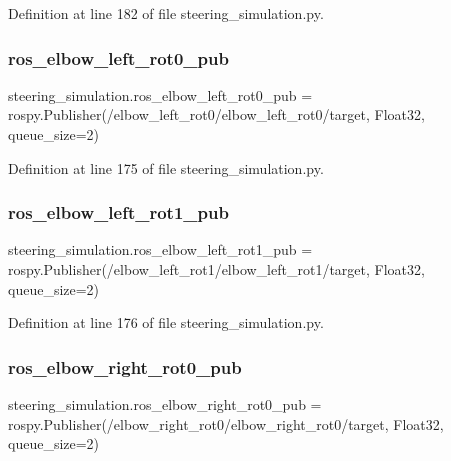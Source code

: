 Definition at line 182 of file steering\+\_\+simulation.\+py.

\mbox{\label{namespacesteering__simulation_a3e18ade3c9e741db3cd48035d7d11b43}} 
\subsubsection{\texorpdfstring{ros\_elbow\_left\_rot0\_pub}{ros\_elbow\_left\_rot0\_pub}}
{\footnotesize\ttfamily steering\+\_\+simulation.\+ros\+\_\+elbow\+\_\+left\+\_\+rot0\+\_\+pub = rospy.\+Publisher(\textquotesingle{}/elbow\+\_\+left\+\_\+rot0/elbow\+\_\+left\+\_\+rot0/target\textquotesingle{}, Float32, queue\+\_\+size=2)}



Definition at line 175 of file steering\+\_\+simulation.\+py.

\mbox{\label{namespacesteering__simulation_a7cf7d50a6b2f01251abedd8a59233be3}} 
\subsubsection{\texorpdfstring{ros\_elbow\_left\_rot1\_pub}{ros\_elbow\_left\_rot1\_pub}}
{\footnotesize\ttfamily steering\+\_\+simulation.\+ros\+\_\+elbow\+\_\+left\+\_\+rot1\+\_\+pub = rospy.\+Publisher(\textquotesingle{}/elbow\+\_\+left\+\_\+rot1/elbow\+\_\+left\+\_\+rot1/target\textquotesingle{}, Float32, queue\+\_\+size=2)}



Definition at line 176 of file steering\+\_\+simulation.\+py.

\mbox{\label{namespacesteering__simulation_a3d22b5897eee35c841b1df82b5d02111}} 
\subsubsection{\texorpdfstring{ros\_elbow\_right\_rot0\_pub}{ros\_elbow\_right\_rot0\_pub}}
{\footnotesize\ttfamily steering\+\_\+simulation.\+ros\+\_\+elbow\+\_\+right\+\_\+rot0\+\_\+pub = rospy.\+Publisher(\textquotesingle{}/elbow\+\_\+right\+\_\+rot0/elbow\+\_\+right\+\_\+rot0/target\textquotesingle{}, Float32, queue\+\_\+size=2)}



